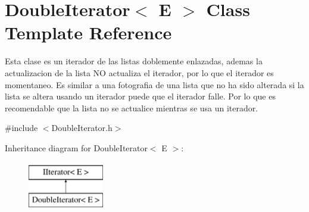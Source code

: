 \hypertarget{class_double_iterator}{\section{Double\-Iterator$<$ E $>$ Class Template Reference}
\label{class_double_iterator}
}


Esta clase es un iterador de las listas doblemente enlazadas, ademas la actualizacion de la lista N\-O actualiza el iterador, por lo que el iterador es momentaneo. Es similar a una fotografia de una lista que no ha sido alterada si la lista se altera usando un iterador puede que el iterador falle. Por lo que es recomendable que la lista no se actualice mientras se usa un iterador.  




{\ttfamily \#include $<$Double\-Iterator.\-h$>$}

Inheritance diagram for Double\-Iterator$<$ E $>$\-:\begin{figure}[H]
\begin{center}
\leavevmode
\includegraphics[height=2.000000cm]{class_double_iterator}
\end{center}
\end{figure}
